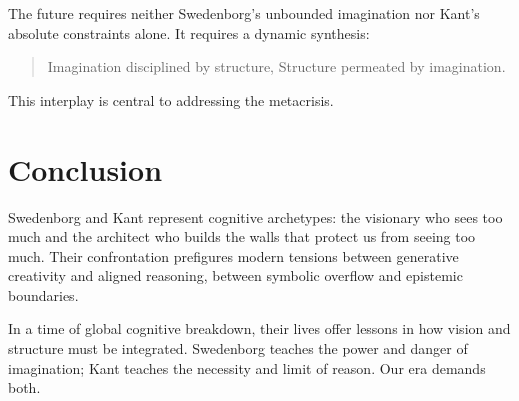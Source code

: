 \documentclass[12pt]{article}
\begin{document}
The future requires neither Swedenborg's unbounded imagination nor Kant’s 
absolute constraints alone. It requires a dynamic synthesis:  
\begin{quote}
Imagination disciplined by structure,  
Structure permeated by imagination.
\end{quote}

This interplay is central to addressing the metacrisis.

\section{Conclusion}

Swedenborg and Kant represent cognitive archetypes: the visionary who sees too 
much and the architect who builds the walls that protect us from seeing too 
much. Their confrontation prefigures modern tensions between generative 
creativity and aligned reasoning, between symbolic overflow and epistemic 
boundaries.

In a time of global cognitive breakdown, their lives offer lessons in how 
vision and structure must be integrated. Swedenborg teaches the power and 
danger of imagination; Kant teaches the necessity and limit of reason. Our era demands both.
\end{document}
